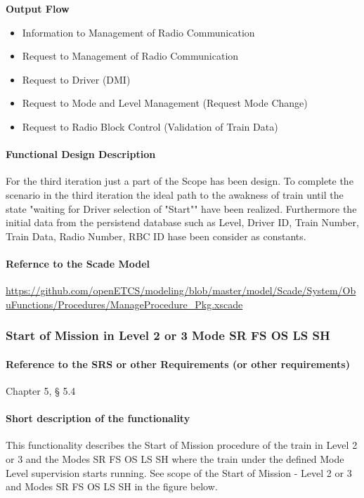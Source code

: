 \textbf{Output Flow}
\begin{itemize}
\item Information to Management of Radio Communication
\item Request to Management of Radio Communication
\item Request to Driver (DMI)
\item Request to Mode and Level Management (Request Mode Change)
\item Request to Radio Block Control (Validation of Train Data)
\end{itemize}

\paragraph{Functional Design Description}
For the third iteration just a part of the Scope has been design. To complete the scenario in the third iteration the ideal path to the awakness of train until the state "waiting for Driver selection of "Start"" have been realized. Furthermore the initial data from the persistend database such as Level, Driver ID, Train Number, Train Data, Radio Number, RBC ID hase been consider as constants. 

\paragraph{Refernce to the Scade Model}
\url{https://github.com/openETCS/modeling/blob/master/model/Scade/System/ObuFunctions/Procedures/ManageProcedure_Pkg.xscade}

\subsubsection{Start of Mission in Level 2 or 3 Mode SR FS OS LS SH}
\paragraph{Reference to the SRS or other Requirements (or other requirements)}
Chapter 5, § 5.4
\paragraph{Short description of the functionality}
This functionality describes the Start of Mission procedure of the train in Level 2 or 3 and the Modes SR FS OS LS SH where the train under the defined Mode Level supervision starts running.
See scope of the Start of Mission - Level 2 or 3 and Modes SR FS OS LS SH in the figure below.

